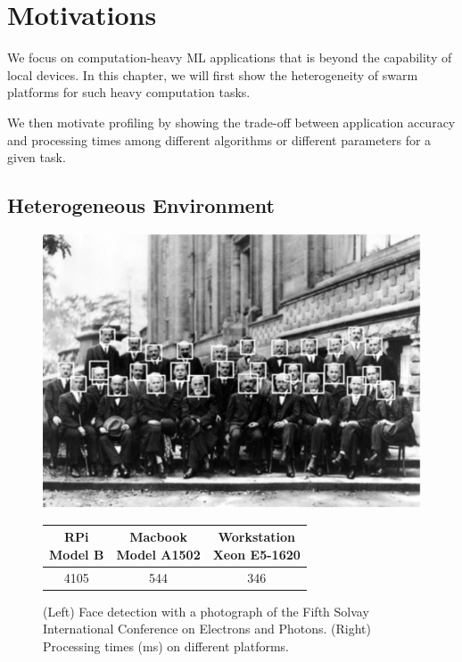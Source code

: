\section{Motivations}
\label{sec:motivation}

We focus on computation-heavy ML applications that is beyond the capability of
local devices. In this chapter, we will first show the heterogeneity of swarm
platforms for such heavy computation tasks.

We then motivate profiling by showing the trade-off between application accuracy
and processing times among different algorithms or different parameters for a
given task.

\subsection{Heterogeneous Environment}

\begin{figure}
  \begin{minipage}{0.4\textwidth}
    \centering
    \includegraphics[width=.9\textwidth]{figures/physicist.pdf}
    \label{fig:physicist}
  \end{minipage}%
  \begin{minipage}{0.6\textwidth}
    \centering
    \begin{tabular}{c c c}
      \toprule
      \specialcell{RPi\\Model B}
      & \specialcell{Macbook \\ Model A1502}
      & \specialcell{Workstation\\Xeon E5-1620} \\
      \midrule
      4105 & 544 & 346 \\
      \bottomrule
    \end{tabular}
  \end{minipage}
  \caption{(Left) Face detection with a photograph of the Fifth Solvay
    International Conference on Electrons and Photons. (Right) Processing times
    (ms) on different platforms.}
\end{figure}

